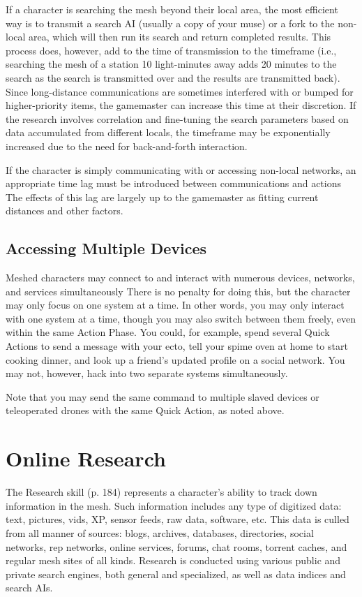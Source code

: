 If a character is searching the mesh beyond their 
local area, the most efficient way is to transmit a search 
AI (usually a copy of your muse) or a fork to the non-local
area, which will then run its search and return
completed results. This process does, however, add to 
the time of transmission to the timeframe (i.e., searching
the mesh of a station 10 light-minutes away adds
20 minutes to the search as the search is transmitted 
over and the results are transmitted back). Since long-distance
communications are sometimes interfered with
or bumped for higher-priority items, the gamemaster 
can increase this time at their discretion. If the research 
involves correlation and fine-tuning the search parameters
based on data accumulated from different locals,
the timeframe may be exponentially increased due to 
the need for back-and-forth interaction.

If the character is simply communicating with or 
accessing non-local networks, an appropriate time lag 
must be introduced between communications and actions
The effects of this lag are largely up to the gamemaster
as fitting current distances and other factors.

\subsection{Accessing Multiple Devices}

Meshed characters may connect to and interact with 
numerous devices, networks, and services simultaneously
There is no penalty for doing this, but the
character may only focus on one system at a time. In 
other words, you may only interact with one system 
at a time, though you may also switch between them 
freely, even within the same Action Phase. You could, 
for example, spend several Quick Actions to send a 
message with your ecto, tell your spime oven at home 
to start cooking dinner, and look up a friend's updated 
profile on a social network. You may not, however, 
hack into two separate systems simultaneously.

Note that you may send the same command to 
multiple slaved devices or teleoperated drones with 
the same Quick Action, as noted above.

\section{Online Research}

The Research skill (p. 184) represents a character's 
ability to track down information in the mesh. Such 
information includes any type of digitized data: text, 
pictures, vids, XP, sensor feeds, raw data, software, etc. 
This data is culled from all manner of sources: blogs, 
archives, databases, directories, social networks, rep 
networks, online services, forums, chat rooms, torrent 
caches, and regular mesh sites of all kinds. Research 
is conducted using various public and private search 
engines, both general and specialized, as well as data 
indices and search AIs.

